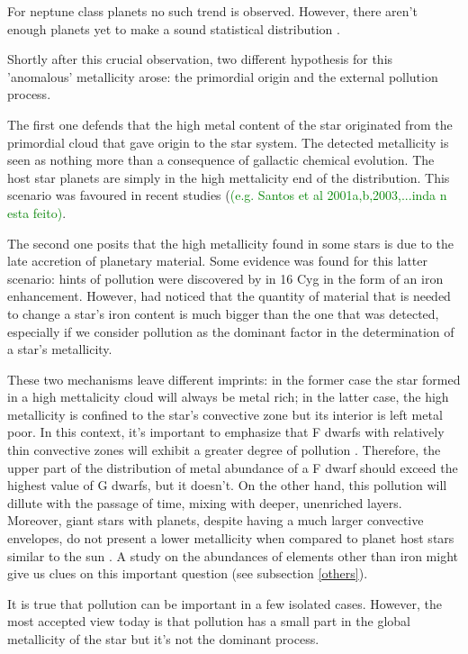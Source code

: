 \documentclass[dvips,12pt,a4paper]{report}
\begin{document}
For neptune class planets no such trend is observed. However, there aren't enough planets yet to make a sound statistical distribution \citep{Udry-2006}.

Shortly after this crucial observation, two different hypothesis for this 'anomalous' metallicity arose: the primordial origin and the external pollution process. 

The first one defends that the high metal content of the star originated from the primordial cloud that gave origin to the star system. The detected metallicity is seen as nothing more than a consequence of gallactic chemical evolution. The host star planets are simply in the high mettalicity end of the distribution. This scenario was favoured in recent studies (\textcolor{green}{(e.g. Santos et al 2001a,b,2003,...inda n esta feito)}. 

The second one posits that the high metallicity found in some stars is due to the late accretion of planetary material. Some evidence was found for this latter scenario: hints of pollution were discovered by \citet{Gonzalez-1998} in 16 Cyg  in the form of an iron enhancement. However, \citet{Santos-2001b} had noticed that the quantity of material that is needed to change a star's iron content is much bigger than the one that was detected, especially if we consider pollution as the dominant factor in the determination of a star's metallicity. 

These two mechanisms leave different imprints: in the former case the star formed in a high mettalicity cloud will always be metal rich; in the latter case, the high metallicity is confined to the star's convective zone but its interior is left metal poor. In this context, it's important to emphasize that F dwarfs with relatively thin convective zones will exhibit a greater degree of pollution \citep{Fischer-2005}. Therefore, the upper part of the distribution of metal abundance of a F dwarf should exceed the highest value of G dwarfs, but it doesn't. On the other hand, this pollution will dillute with the passage of time, mixing with deeper, unenriched layers. Moreover, giant stars with planets, despite having a much larger convective envelopes, do not present a lower metallicity when compared to planet host stars similar to the sun \citep{Ecuvillon-2006b}. A study on the abundances of elements other than iron might give us clues on this important question (see subsection \ref{others}).

It is true that pollution can be important in a few isolated cases. However, the most accepted view today is that pollution has a small part in the global metallicity of the star but it's not the dominant process. 
\end{document}

